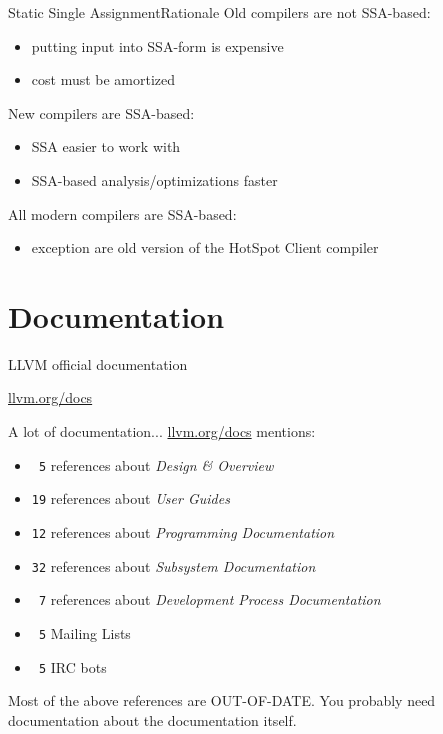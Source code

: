 \documentclass[10pt,mathserif]{beamer}
\begin{document}
\begin{frame}{Static Single Assignment}{Rationale}
	Old compilers are not SSA-based:
	\begin{itemize}
		\item putting input into SSA-form is expensive
		\item cost must be amortized
	\end{itemize}
	
	\vfill
	New compilers are SSA-based:
	\begin{itemize}
		\item SSA easier to work with
		\item SSA-based analysis/optimizations faster
	\end{itemize}
	
	\vfill
	All modern compilers are SSA-based:
	\begin{itemize}
		\item exception are old version of the HotSpot Client compiler
	\end{itemize}
\end{frame}


\section{Documentation}
\begin{frame}[t]{LLVM official documentation}
	\begin{center}
		\begin{Huge}
			\vfill
			\url{llvm.org/docs}
			\vfill
		\end{Huge}
	\end{center}
\end{frame}

\begin{frame}[t]{A lot of documentation...}
	\url{llvm.org/docs} mentions:
	\begin{itemize}
		\item \texttt{\ 5} references about \textit{Design \& Overview}
		\item \texttt{19} references about \textit{User Guides}
		\item \texttt{12} references about \textit{Programming Documentation}
		\item \texttt{32} references about \textit{Subsystem Documentation}
		\item \texttt{\ 7} references about \textit{Development Process Documentation}
		\item \texttt{\ 5} Mailing Lists
		\item \texttt{\ 5} IRC bots
	\end{itemize}
	\vfill
	Most of the above references are \alert{OUT-OF-DATE}.
	\vfill
	You probably need documentation about the documentation itself.
	\vfill
\end{frame}
\end{document}
